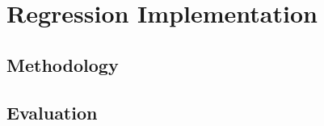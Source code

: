\documentclass{article}
\begin{document}


\section{Regression Implementation}
\subsection{Methodology}

\subsection{Evaluation}
\end{document}
